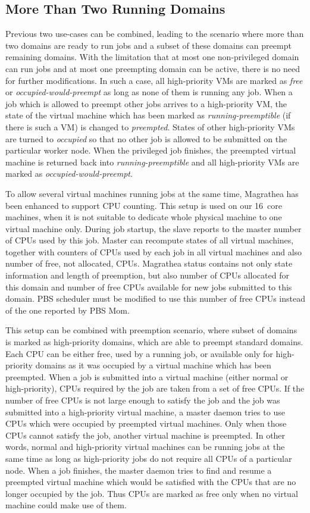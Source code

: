 \documentclass[a4paper]{article}
\begin{document}
\subsection{More Than Two Running Domains}

Previous two use-cases can be combined, leading to the scenario where more
than two domains are ready to run jobs and a subset of these domains can
preempt remaining domains. With the limitation that at most one non-privileged
domain can run jobs and at most one preempting domain can be active, there is
no need for further modifications. In such a case, all high-priority VMs are
marked as \emph{free} or \emph{occupied-would-preempt} as long as none of them
is running any job. When a job which is allowed to preempt other jobs arrives
to a high-priority VM, the state of the virtual machine which has been marked
as \emph{running-preemptible} (if there is such a VM) is changed to
\emph{preempted}. States of other high-priority VMs are turned to
\emph{occupied} so that no other job is allowed to be submitted on the
particular worker node. When the privileged job finishes, the preempted
virtual machine is returned back into \emph{running-preemptible} and all
high-priority VMs are marked as \emph{occupied-would-preempt}.

To allow several virtual machines running jobs at the same time, Magrathea has
been enhanced to support CPU counting. This setup is used on our 16~core
machines, when it is not suitable to dedicate whole physical machine to one
virtual machine only. During job startup, the slave reports to the master
number of CPUs used by this job. Master can recompute states of all virtual
machines, together with counters of CPUs used by each job in all virtual
machines and also number of free, not allocated, CPUs. Magrathea status
contains not only state information and length of preemption, but also number
of CPUs allocated for this domain and number of free CPUs available for new
jobs submitted to this domain. PBS scheduler must be modified to use this
number of free CPUs instead of the one reported by PBS Mom.

This setup can be combined with preemption scenario, where subset of domains
is marked as high-priority domains, which are able to preempt standard
domains. Each CPU can be either free, used by a running job, or available only
for high-priority domains as it was occupied by a virtual machine which has
been preempted. When a job is submitted into a virtual machine (either normal
or high-priority), CPUs required by the job are taken from a set of free CPUs.
If the number of free CPUs is not large enough to satisfy the job and the job
was submitted into a high-priority virtual machine, a master daemon tries to
use CPUs which were occupied by preempted virtual machines. Only when those
CPUs cannot satisfy the job, another virtual machine is preempted. In other
words, normal and high-priority virtual machines can be running jobs at the
same time as long as high-priority jobs do not require all CPUs of a
particular node. When a job finishes, the master daemon tries to find and
resume a preempted virtual machine which would be satisfied with the CPUs that
are no longer occupied by the job. Thus CPUs are marked as free only when no
virtual machine could make use of them.
\end{document}
